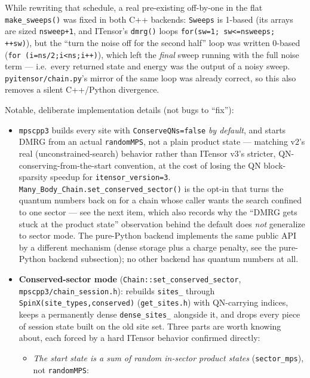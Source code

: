 \documentclass[11pt]{article}
\begin{document}
While rewriting that schedule, a real pre-existing off-by-one in the flat
\texttt{make\_sweeps()} was fixed in both C++ backends: \texttt{Sweeps}
is 1-based (its arrays are sized \texttt{nsweep+1}, and ITensor's
\texttt{dmrg()} loops \texttt{for(sw=1; sw<=nsweeps; ++sw)}), but the
``turn the noise off for the second half'' loop was written 0-based
(\texttt{for (i=ns/2;i<ns;i++)}), which left the \emph{final} sweep
running with the full noise term --- i.e.\ every returned state and
energy was the output of a noisy sweep.
\texttt{pyitensor/chain.py}'s mirror of the same loop was already
correct, so this also removes a silent C++/Python divergence.

Notable, deliberate implementation details (not bugs to ``fix''):

\begin{itemize}
  \item \texttt{mpscpp3} builds every site with \texttt{ConserveQNs=false}
    \emph{by default}, and starts DMRG from an actual
    \texttt{randomMPS}, not a plain product state --- matching v2's real
    (unconstrained-search) behavior rather than ITensor v3's stricter,
    QN-conserving-from-the-start convention, at the cost of losing the QN
    block-sparsity speedup for \texttt{itensor\_version=3}.
    \texttt{Many\_Body\_Chain.set\_conserved\_sector()} is the opt-in
    that turns the quantum numbers back on for a chain whose caller wants
    the search confined to one sector --- see the next item, which also
    records why the ``DMRG gets stuck at the product state'' observation
    behind the default does \emph{not} generalize to sector mode. The
    pure-Python backend implements the same public API by a different
    mechanism (dense storage plus a charge penalty, see the pure-Python
    backend subsection); no other backend has quantum numbers at all.
  \item \textbf{Conserved-sector mode}
    (\texttt{Chain::set\_conserved\_sector},
    \texttt{mpscpp3/chain\_session.h}): rebuilds \texttt{sites\_} through
    \texttt{SpinX(site\_types,conserved)} (\texttt{get\_sites.h}) with
    QN-carrying indices, keeps a permanently dense
    \texttt{dense\_sites\_} alongside it, and drops every piece of
    session state built on the old site set. Three parts are worth
    knowing about, each forced by a hard ITensor behavior confirmed
    directly:
    \begin{itemize}
      \item \emph{The start state is a sum of random in-sector product
        states} (\texttt{sector\_mps}), not \texttt{randomMPS}:

\end{itemize}
\end{itemize}
\end{document}
